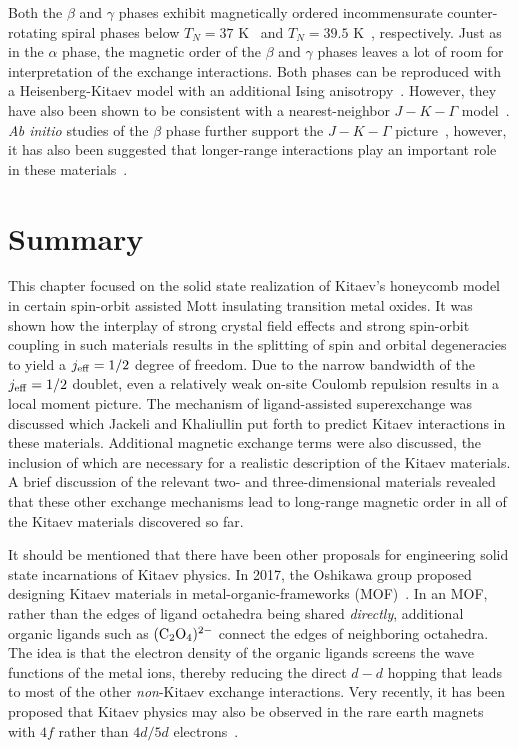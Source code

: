 Both the $\beta$ and $\gamma$ phases exhibit magnetically ordered incommensurate counter-rotating spiral phases below $T_N = 37$ K~\cite{BiffinPRB2014,TakayamaPRL2015} and $T_N = 39.5$ K~\cite{ModicNatComm2014,BiffinPRL2014}, respectively.
Just as in the $\alpha$ phase, the magnetic order of the $\beta$ and $\gamma$ phases leaves a lot of room for interpretation of the exchange interactions.
Both phases can be reproduced with a Heisenberg-Kitaev model with an additional Ising anisotropy~\cite{KimchiPRB2014,KimchiPRB2015}.
However, they have also been shown to be consistent with a nearest-neighbor $J-K-\Gamma$ model~\cite{KimEPL2015,LeePRB2015}.
\textit{Ab initio} studies of the $\beta$ phase further support the $J-K-\Gamma$ picture~\cite{KatukuriSP2016,KimPRB2016,KimEPL2015}, however, it has also been suggested that longer-range interactions play an important role in these materials~\cite{KatukuriSP2016}.


%
%
\section{Summary}
\label{section:chapter03_Summary}
%
%
This chapter focused on the solid state realization of Kitaev's honeycomb model in certain spin-orbit assisted Mott insulating transition metal oxides.
It was shown how the interplay of strong crystal field effects and strong spin-orbit coupling in such materials results in the splitting of spin and orbital degeneracies to yield a $j_{\rm eff} = 1/2$ degree of freedom.
Due to the narrow bandwidth of the $j_{\rm eff} = 1/2$ doublet, even a relatively weak on-site Coulomb repulsion results in a local moment picture.
The mechanism of ligand-assisted superexchange was discussed which Jackeli and Khaliullin put forth to predict Kitaev interactions in these materials.
Additional magnetic exchange terms were also discussed, the inclusion of which are necessary for a realistic description of the Kitaev materials.
A brief discussion of the relevant two- and three-dimensional materials revealed that these other exchange mechanisms lead to long-range magnetic order in all of the Kitaev materials discovered so far.

It should be mentioned that there have been other proposals for engineering solid state incarnations of Kitaev physics.
In 2017, the Oshikawa group proposed designing Kitaev materials in metal-organic-frameworks (MOF)~\cite{MasahikoPRL2017}.
In an MOF, rather than the edges of ligand octahedra being shared \textit{directly}, additional organic ligands such as $({\rm C}_2{\rm O}_4)^{2-}$ connect the edges of neighboring octahedra.
The idea is that the electron density of the organic ligands screens the wave functions of the metal ions, thereby reducing the direct $d-d$ hopping that leads to most of the other \textit{non}-Kitaev exchange interactions.
Very recently, it has been proposed that Kitaev physics may also be observed in the rare earth magnets with $4f$ rather than $4d/5d$ electrons~\cite{LiPRB2017,LuoARXIV2019}.